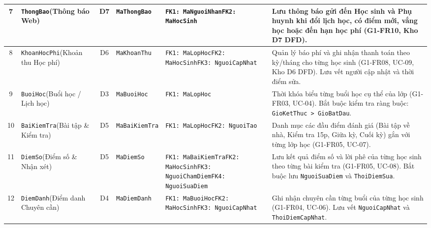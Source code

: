 \documentclass[12pt,a4paper]{article}
\begin{document}
{\begin{longtable}{@{}c >{\raggedright\arraybackslash}p{2.2cm} c >{\raggedright\arraybackslash}p{1.9cm} >{\raggedright\arraybackslash}p{2.6cm} >{\raggedright\arraybackslash}p{4.8cm}@{}}
\midrule
7 & \texttt{ThongBao}\newline (Thông báo Web) & D7 & \texttt{MaThongBao} & \texttt{FK1: MaNguoiNhan}\newline \texttt{FK2: MaHocSinh} & Lưu thông báo gửi đến Học sinh và Phụ huynh khi đổi lịch học, có điểm mới, vắng học hoặc đến hạn học phí (G1-FR10, Kho D7 DFD). \\
\midrule
8 & \texttt{KhoanHocPhi}\newline (Khoản thu Học phí) & D6 & \texttt{MaKhoanThu} & \texttt{FK1: MaLopHoc}\newline \texttt{FK2: MaHocSinh}\newline \texttt{FK3: NguoiCapNhat} & Quản lý báo phí và ghi nhận thanh toán theo kỳ/tháng cho từng học sinh (G1-FR08, UC-09, Kho D6 DFD). Lưu vết người cập nhật và thời điểm sửa. \\
\midrule
9 & \texttt{BuoiHoc}\newline (Buổi học / Lịch học) & D3 & \texttt{MaBuoiHoc} & \texttt{FK1: MaLopHoc} & Thời khóa biểu từng buổi học cụ thể của lớp (G1-FR03, UC-04). Bắt buộc kiểm tra ràng buộc: \texttt{GioKetThuc > GioBatDau}. \\
\midrule
10 & \texttt{BaiKiemTra}\newline (Bài tập \& Kiểm tra) & D5 & \texttt{MaBaiKiemTra} & \texttt{FK1: MaLopHoc}\newline \texttt{FK2: NguoiTao} & Danh mục các đầu điểm đánh giá (Bài tập về nhà, Kiểm tra 15p, Giữa kỳ, Cuối kỳ) gắn với từng lớp học (G1-FR05, UC-07). \\
\midrule
11 & \texttt{DiemSo}\newline (Điểm số \& Nhận xét) & D5 & \texttt{MaDiemSo} & \texttt{FK1: MaBaiKiemTra}\newline \texttt{FK2: MaHocSinh}\newline \texttt{FK3: NguoiChamDiem}\newline \texttt{FK4: NguoiSuaDiem} & Lưu kết quả điểm số và lời phê của từng học sinh theo từng bài kiểm tra (G1-FR05, UC-08). Bắt buộc lưu \texttt{NguoiSuaDiem} và \texttt{ThoiDiemSua}. \\
\midrule
12 & \texttt{DiemDanh}\newline (Điểm danh Chuyên cần) & D4 & \texttt{MaDiemDanh} & \texttt{FK1: MaBuoiHoc}\newline \texttt{FK2: MaHocSinh}\newline \texttt{FK3: NguoiCapNhat} & Ghi nhận chuyên cần từng buổi của từng học sinh (G1-FR04, UC-06). Lưu vết \texttt{NguoiCapNhat} và \texttt{ThoiDiemCapNhat}. \\
\bottomrule
\end{longtable}
}
\end{document}
